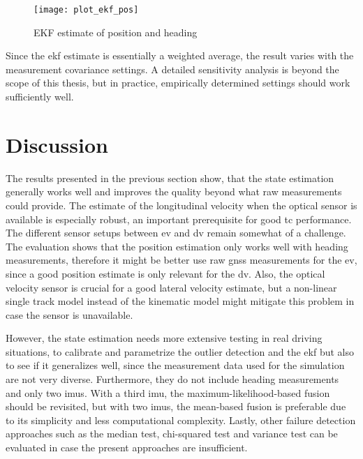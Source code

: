 \begin{figure}[t]
	\centering
	\texttt{[image: plot\_ekf\_pos]}%
	\caption{EKF estimate of position and heading}
	\label{fig:ekf-position}
\end{figure}

Since the \gls{ekf} estimate is essentially a weighted average, the result varies with the measurement covariance settings. A detailed sensitivity analysis is beyond the scope of this thesis, but in practice, empirically determined settings should work sufficiently well.

\section{Discussion}
The results presented in the previous section show, that the state estimation generally works well and improves the quality beyond what raw measurements could provide. The estimate of the longitudinal velocity when the optical sensor is available is especially robust, an important prerequisite for good \gls{tc} performance. The different sensor setups between \gls{ev} and \gls{dv} remain somewhat of a challenge. The evaluation shows that the position estimation only works well with heading measurements, therefore it might be better use raw \gls{gnss} measurements for the \gls{ev}, since a good position estimate is only relevant for the \gls{dv}. Also, the optical velocity sensor is crucial for a good lateral velocity estimate, but a non-linear single track model instead of the kinematic model might mitigate this problem in case the sensor is unavailable.

However, the state estimation needs more extensive testing in real driving situations, to calibrate and parametrize the outlier detection and the \gls{ekf} but also to see if it generalizes well, since the measurement data used for the simulation are not very diverse. Furthermore, they do not include heading measurements and only two \glspl{imu}. With a third \gls{imu}, the maximum-likelihood-based fusion should be revisited, but with two \glspl{imu}, the mean-based fusion is preferable due to its simplicity and less computational complexity. Lastly, other failure detection approaches such as the median test, chi-squared test and variance test can be evaluated in case the present approaches are insufficient.
